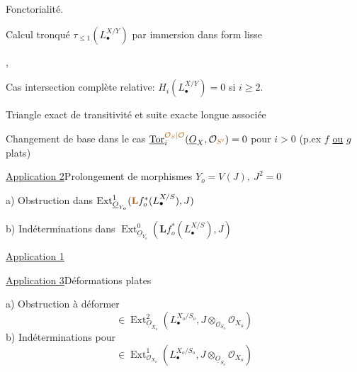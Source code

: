 Fonctorialité.

Calcul tronqué $\tau_{\leq1}(L_\bullet^{X/Y})$ par immersion dans form lisse

, 

Cas intersection complète relative: $H_i(L_\bullet^{X/Y})=0$ si $i\geq2$.

Triangle exact de transitivité et suite exacte longue associée

Changement de base
dans le cas $\underline{\operatorname{Tor}}_i^{\unsure{\mathcal O_S|\mathcal O}}(\underline O_X,\mathcal O_{\unsure{S'}})=0$ pour $i>0$ (p.ex $f$ \uline{ou} $g$ plats)

\uline{Application 2}\quad Prolongement de morphismes
$Y_o=V(J),\ J^2=0$

a) Obstruction dans $\operatorname{Ext}^1_{\underline O_{Y_o}}(\unsure{\mathbf L}f_o^*(L_\bullet^{X/S}),J)$

b) Indéterminations dans $\operatorname{Ext}^0_{\underline O_{Y_o}}(\mathbf Lf_o^*(L_\bullet^{X/S}),J)$

\uline{Application 1}

\uline{Application 3}\quad Déformations plates

a) Obstruction à déformer
\[
\in\operatorname{Ext}^2_{\underline O_{X_o}}(L_\bullet^{X_o/S_o},J\otimes_{\mathcal O_{S_o}}\mathcal O_{X_o})
\]
b) Indéterminations pour 
\[
\in\operatorname{Ext}^1_{\mathcal O_{X_o}}(L_\bullet^{X_o/S_o},J\otimes_{\underline O_{S_o}}\mathcal O_{X_o})
\]

